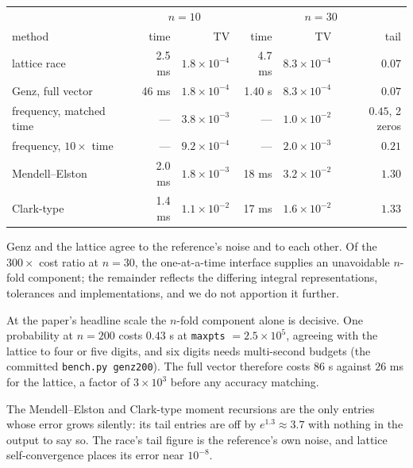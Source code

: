 \documentclass[11pt]{article}
\begin{document}
\begin{center}\small
\begin{tabular}{lrrrrr}
\toprule
& \multicolumn{2}{c}{$n=10$} & \multicolumn{3}{c}{$n=30$}\\
method & time & TV & time & TV & tail\\
\midrule
lattice race & 2.5 ms & $1.8\times10^{-4}$ & 4.7 ms & $8.3\times10^{-4}$ & $0.07$\\
Genz, full vector & 46 ms & $1.8\times10^{-4}$ & 1.40 s & $8.3\times10^{-4}$ & $0.07$\\
frequency, matched time & --- & $3.8\times10^{-3}$ & --- & $1.0\times10^{-2}$ & $0.45$, 2 zeros\\
frequency, $10\times$ time & --- & $9.2\times10^{-4}$ & --- & $2.0\times10^{-3}$ & $0.21$\\
Mendell--Elston & 2.0 ms & $1.8\times10^{-3}$ & 18 ms & $3.2\times10^{-2}$ & $1.30$\\
Clark-type & 1.4 ms & $1.1\times10^{-2}$ & 17 ms & $1.6\times10^{-2}$ & $1.33$\\
\bottomrule
\end{tabular}
\end{center}

Genz and the lattice agree to the reference's noise and to each other.
Of the $300\times$ cost ratio at $n=30$, the one-at-a-time interface
supplies an unavoidable $n$-fold component; the remainder reflects the
differing integral representations, tolerances and implementations, and
we do not apportion it further.

At the paper's headline scale the $n$-fold component alone is decisive.
One probability at $n=200$ costs $0.43$ s at \texttt{maxpts}
$=2.5\times10^{5}$, agreeing with the lattice to four or five digits, and
six digits needs multi-second budgets (the committed \texttt{bench.py
genz200}). The full vector therefore costs $86$ s against $26$ ms for the
lattice, a factor of $3\times10^{3}$ before any accuracy matching.

The Mendell--Elston and Clark-type moment recursions are the only
entries whose error grows
silently: its tail entries are off by $e^{1.3}\approx3.7$ with nothing in
the output to say so. The race's tail figure is the reference's own
noise, and lattice self-convergence places its error near $10^{-8}$.
\end{document}
